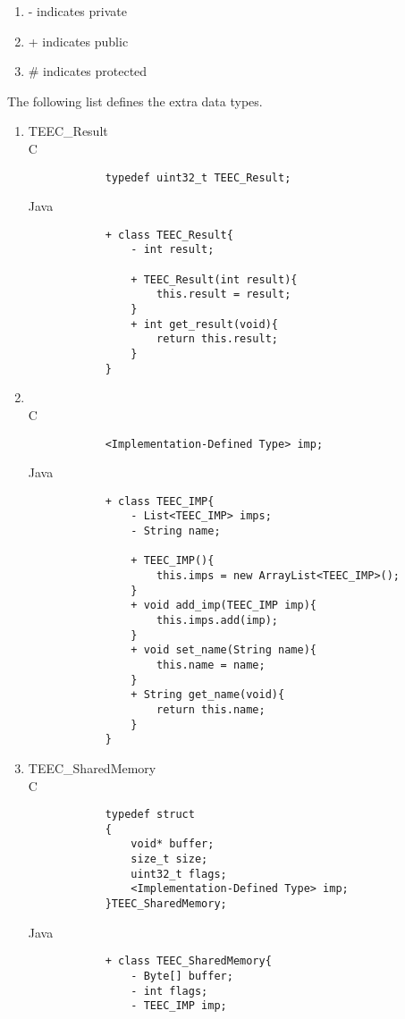 \documentclass{cseminar}
\begin{document}
\begin{enumerate}
	\item[] - indicates private
	\item[] + indicates public
	\item[] \# indicates protected
\end{enumerate}
The following list defines the extra data types.
\begin{enumerate}
	\item TEEC\_Result
			\\C
			\begin{lstlisting}
			typedef uint32_t TEEC_Result;
			\end{lstlisting}
	
			Java
			\begin{lstlisting}
			+ class TEEC_Result{
				- int result;
				
				+ TEEC_Result(int result){
					this.result = result;						
				}
				+ int get_result(void){
					return this.result;						
				}
			}
			\end{lstlisting}
			
	\item <Implementation-Defined Type>
			\\C
			\begin{lstlisting}
			<Implementation-Defined Type> imp;
			\end{lstlisting}
	
			Java
			\begin{lstlisting}
			+ class TEEC_IMP{
				- List<TEEC_IMP> imps;
				- String name;
				
				+ TEEC_IMP(){
					this.imps = new	ArrayList<TEEC_IMP>();
				}
				+ void add_imp(TEEC_IMP imp){
					this.imps.add(imp);						
				}
				+ void set_name(String name){
					this.name = name;				
				}
				+ String get_name(void){
					return this.name;				
				}
			}
			\end{lstlisting}
			
	\item TEEC\_SharedMemory
			\\C
			\begin{lstlisting}
			typedef struct
			{
				void* buffer;
				size_t size;
				uint32_t flags;
				<Implementation-Defined Type> imp;
			}TEEC_SharedMemory;
			\end{lstlisting}
			
			Java
			\begin{lstlisting}
			+ class TEEC_SharedMemory{
				- Byte[] buffer;
				- int flags;
				- TEEC_IMP imp;
				

\end{lstlisting}
\end{enumerate}
\end{document}
